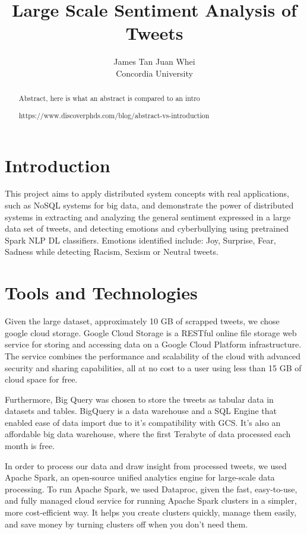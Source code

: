 \documentclass[a4paper,12pt]{article}
\begin{document}
\title{Large Scale Sentiment Analysis of Tweets }%
\author{
	James Tan Juan Whei\\
	Concordia University
}  
\maketitle

\begin{abstract}
Abstract, here is what an abstract is compared to an intro

https://www.discoverphds.com/blog/abstract-vs-introduction
\end{abstract}

\section{Introduction}

This project aims to apply distributed system concepts with real applications, such as NoSQL systems for big data,
and demonstrate the power of distributed systems in extracting and analyzing the general sentiment expressed in a large
data set of tweets, and detecting emotions and cyberbullying using pretrained Spark NLP DL classifiers.
Emotions identified include: Joy, Surprise, Fear, Sadness while detecting Racism, Sexism or Neutral tweets.


\section{Tools and Technologies}
Given the large dataset, approximately 10 GB of scrapped tweets, we chose google cloud storage.
Google Cloud Storage is a RESTful online file storage web service for storing and accessing data on a Google Cloud
Platform infrastructure. The service combines the performance and scalability of the cloud with advanced
security and sharing capabilities, all at no cost to a user using less than 15 GB of cloud space for free.

Furthermore, Big Query was chosen to store the tweets as tabular data in datasets and tables. BigQuery is a data warehouse
and a SQL Engine that enabled ease of data import due to it's compatibility with GCS. It's also an affordable big data
warehouse, where the first Terabyte of data processed each month is free.

In order to process our data and draw insight from processed tweets, we used Apache Spark, an open-source unified analytics engine for
large-scale data processing. To run Apache Spark, we used Dataproc, given the fast, easy-to-use, and fully managed cloud
service for running Apache Spark clusters in a simpler, more cost-efficient way. It helps you create clusters quickly,
manage them easily, and save money by turning clusters off when you don't need them.
\end{document}
